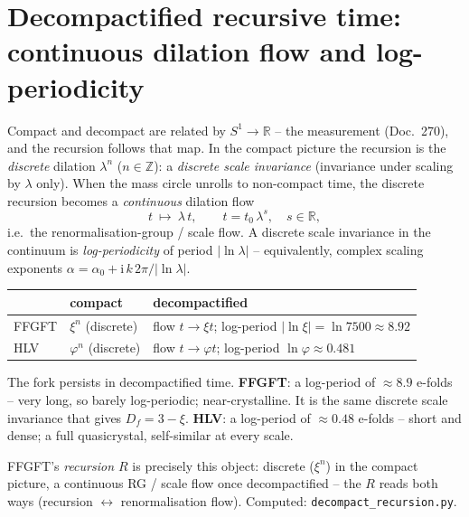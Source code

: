 \section{Decompactified recursive time: continuous dilation flow and log-periodicity}
Compact and decompact are related by $S^1\to\mathbb{R}$ -- the measurement (Doc.~270), and
the recursion follows that map. In the compact picture the recursion is the \emph{discrete}
dilation $\lambda^n$ ($n\in\mathbb{Z}$): a \emph{discrete scale invariance} (invariance under
scaling by $\lambda$ only). When the mass circle unrolls to non-compact time, the discrete
recursion becomes a \emph{continuous} dilation flow
\begin{equation}
t\ \longmapsto\ \lambda\,t,\qquad t=t_0\,\lambda^{s},\quad s\in\mathbb{R},
\end{equation}
i.e.\ the renormalisation-group / scale flow. A discrete scale invariance in the continuum is
\emph{log-periodicity} of period $|\ln\lambda|$ -- equivalently, complex scaling exponents
$\alpha=\alpha_0+\mathrm i\,k\,2\pi/|\ln\lambda|$.

\begin{center}\small
\renewcommand{\arraystretch}{1.2}
\begin{tabular}{@{}p{1.8cm} p{2.6cm} p{6.2cm}@{}}
\toprule
 & compact & decompactified \\
\midrule
FFGFT & $\xi^n$ (discrete) & flow $t\to\xi t$; log-period $|\ln\xi|=\ln 7500\approx8.92$ \\
HLV & $\varphi^n$ (discrete) & flow $t\to\varphi t$; log-period $\ln\varphi\approx0.481$ \\
\bottomrule
\end{tabular}
\end{center}

\noindent The fork persists in decompactified time. \textbf{FFGFT}: a log-period of
$\approx8.9$ e-folds -- very long, so barely log-periodic; near-crystalline. It is the same
discrete scale invariance that gives $D_f=3-\xi$. \textbf{HLV}: a log-period of
$\approx0.48$ e-folds -- short and dense; a full quasicrystal, self-similar at every scale.

FFGFT's \emph{recursion $R$} is precisely this object: discrete ($\xi^n$) in the compact
picture, a continuous RG / scale flow once decompactified -- the $R$ reads both ways
(recursion $\leftrightarrow$ renormalisation flow). Computed: \texttt{decompact\_recursion.py}.

